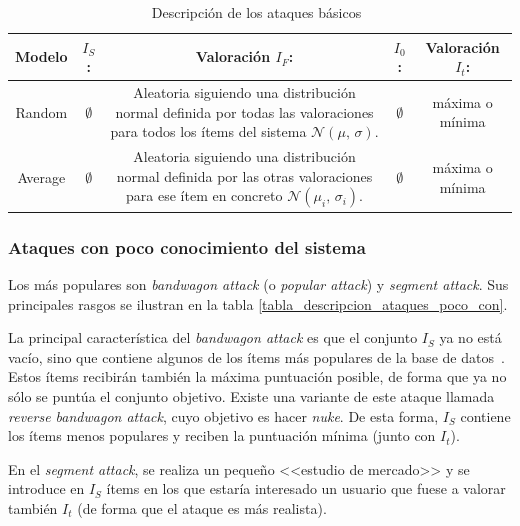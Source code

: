 \begin{table}\centering
	\resizebox{15cm}{!} {
		\begin{tabular}{c c c c c}\toprule
		Modelo & \textbf{$I_S$:} & Valoración \textbf{$I_F$:} & \textbf{$I_0$:} & Valoración \textbf{$I_t$:} \\ \midrule
	
		Random & $\emptyset$ & \parbox{20em}{Aleatoria siguiendo una distribución normal definida por todas las valoraciones para todos los ítems del sistema $\mathcal{N}(\mu,\,\sigma)$.} & $\emptyset$ & máxima o mínima \\
		
		Average & $\emptyset$ & \parbox{20em}{Aleatoria siguiendo una distribución normal definida por las otras valoraciones para ese ítem en concreto $\mathcal{N}(\mu_i,\,\sigma_i)$.} & $\emptyset$ & máxima o mínima \\
		\bottomrule
		\end{tabular}
	}
	\caption{Descripción de los ataques básicos~\cite{zhou2021SemisupervisedRecommendationAttack}}
	\label{tabla_descripcion_ataques_basicos}	
\end{table}


\subsubsection{Ataques con poco conocimiento del sistema}

Los más populares son \textit{bandwagon attack} (o \textit{popular attack}) y \textit{segment attack}. Sus principales rasgos se ilustran en la tabla \ref{tabla_descripcion_ataques_poco_con}.

La principal característica del \textit{bandwagon attack} es que el conjunto $I_S$ ya no está vacío, sino que contiene algunos de los ítems más populares de la base de datos~\cite{zhou2021SemisupervisedRecommendationAttack}. Estos ítems recibirán también la máxima puntuación posible, de forma que ya no sólo se puntúa el conjunto objetivo. Existe una variante de este ataque llamada \textit{reverse bandwagon attack}, cuyo objetivo es hacer \textit{nuke}. De esta forma, $I_S$ contiene los ítems menos populares y reciben la puntuación mínima (junto con $I_t$).

En el \textit{segment attack}, se realiza un pequeño <<estudio de mercado>> y se introduce en $I_S$ ítems en los que estaría interesado un usuario que fuese a valorar también $I_t$ (de forma que el ataque es más realista).


